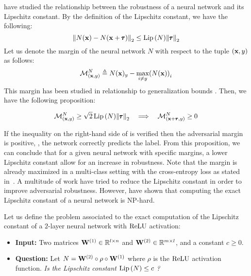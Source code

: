\citet{tsuzuku2018lipschitz} have studied the relationship between the robustness of a neural network and its Lipschitz constant. 
By the definition of the Lipschitz constant, we have the following:
\begin{equation}
  \norm{N(\mathbf{x}) - N(\mathbf{x} + \pmb{\tau})}_2 \leq \operatorname{Lip}{(N)} \norm{\pmb{\tau}}_2
\end{equation}
Let us denote the margin of the neural network $N$ with respect to the tuple $(\mathbf{x}, y)$ as follows:
\begin{equation}
  \mathcal{M}^{N}_{(\xvec, y)} \triangleq N(\xvec)_y - \max_{i \neq y} \left( N(\xvec) \right)_i
\end{equation}
This margin has been studied in relationship to generalization bounds \cite{langford2002pac,bartlett2017spectrally,neyshabur2018pacbayesian}.
Then, we have the following proposition:
\begin{proposition}
  \begin{equation}
    \mathcal{M}^{N}_{(\mathbf{x}, y)} \geq \sqrt{2} \operatorname{Lip}{(N)} \norm{\pmb{\tau}}_2 \quad \Longrightarrow \quad \mathcal{M}^{N}_{(\mathbf{x} + \pmb{\tau}, y)} \geq 0
    \label{equation:ch3-margin_guarded_area}
  \end{equation}
\end{proposition}
\noindent
If the inequality on the right-hand side of  is verified then the adversarial margin is positive, \ie, the network correctly predicts the label. 
From this proposition, we can conclude that for a given neural network with specific margins, a lower Lipschitz constant allow for an increase in robustness. 
Note that the margin is already maximized in a multi-class setting with the cross-entropy loss as stated in~\citet{hein2017formal}.
A multitude of work have tried to reduce the Lipschitz constant in order to improve adversarial robustness.
However, \citet{scaman2018lipschitz} have shown that computing the exact Lipschitz constant of a neural network is NP-hard.

\begin{problem}
  Let us define the problem associated to the exact computation of the Lipschitz constant of a $2$-layer neural network with $\operatorname{ReLU}$ activation:
  \begin{itemize}[topsep=0pt,noitemsep]
    \item[] \textbf{Input:} Two matrices $\mathbf{W}^{(1)} \in \mathbb{R}^{l \times n}$ and $\mathbf{W}^{(2)} \in \mathbb{R}^{m \times l}$, and a constant $c \geq 0$.
    \item[] \textbf{Question:} Let $N = \mathbf{W}^{(2)} \circ \rho \circ \mathbf{W}^{(1)}$ where $\rho$ is the $\operatorname{ReLU}$ activation function. \emph{Is the Lipschitz constant $\operatorname{Lip}{(N)} \leq c$ ?}
  \end{itemize}
  \label{problem:ch3-lipschitz_computation}
\end{problem}


